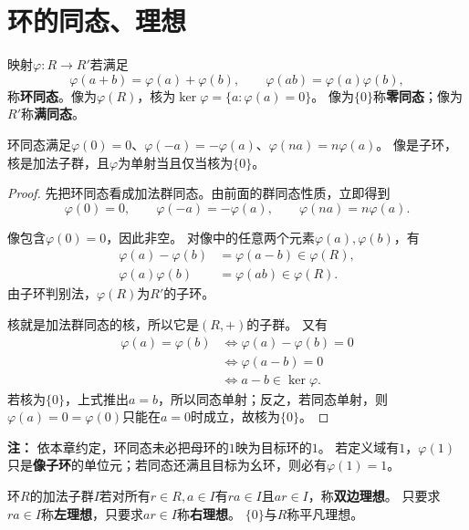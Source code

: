\section{环的同态、理想}
\begin{definition}
\label{p2:concept:c1-l1152}映射$\varphi:R\to R'$若满足
\[
\varphi(a+b)=\varphi(a)+\varphi(b),\qquad\varphi(ab)=\varphi(a)\varphi(b),
\]
\label{p2:concept:c1-l1156}称\textbf{环同态}。像为$\varphi(R)$，核为$\ker\varphi=\{a:\varphi(a)=0\}$。
\label{p2:concept:c1-l1157}像为$\{0\}$称\textbf{零同态}；像为$R'$称\textbf{满同态}。
\end{definition}

\begin{proposition}
环同态满足$\varphi(0)=0$、$\varphi(-a)=-\varphi(a)$、$\varphi(na)=n\varphi(a)$。
像是子环，核是加法子群，且$\varphi$为单射当且仅当核为$\{0\}$。
\end{proposition}
\begin{proof}
先把环同态看成加法群同态。由前面的群同态性质，立即得到
\[
\varphi(0)=0,\qquad
\varphi(-a)=-\varphi(a),\qquad
\varphi(na)=n\varphi(a).
\]

像包含$\varphi(0)=0$，因此非空。
对像中的任意两个元素$\varphi(a),\varphi(b)$，有
\[
\begin{aligned}
\varphi(a)-\varphi(b)&=\varphi(a-b)\in\varphi(R),\\
\varphi(a)\varphi(b)&=\varphi(ab)\in\varphi(R).
\end{aligned}
\]
由子环判别法，$\varphi(R)$为$R'$的子环。

核就是加法群同态的核，所以它是$(R,+)$的子群。
又有
\[
\begin{aligned}
\varphi(a)=\varphi(b)
&\iff\varphi(a)-\varphi(b)=0\\
&\iff\varphi(a-b)=0\\
&\iff a-b\in\ker\varphi.
\end{aligned}
\]
若核为$\{0\}$，上式推出$a=b$，所以同态单射；反之，若同态单射，则
$\varphi(a)=0=\varphi(0)$只能在$a=0$时成立，故核为$\{0\}$。
\end{proof}

\textbf{注：}
依本章约定，环同态未必把母环的$1$映为目标环的$1$。
若定义域有$1$，$\varphi(1)$只是\textbf{像子环}的单位元；若同态还满且目标为幺环，则必有$\varphi(1)=1$。

\begin{definition}
\label{p2:concept:c1-l1201}环$R$的加法子群$I$若对所有$r\in R,a\in I$有$ra\in I$且$ar\in I$，称\textbf{双边理想}。
\label{p2:concept:c1-l1202}只要求$ra\in I$称\textbf{左理想}，只要求$ar\in I$称\textbf{右理想}。
\label{p2:concept:c1-l1203}$\{0\}$与$R$称平凡理想。
\end{definition}

